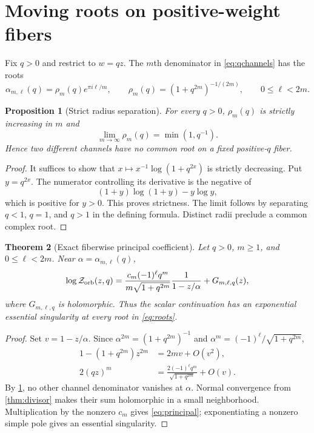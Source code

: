 \documentclass[11pt]{article}
\newtheorem{theorem}{Theorem}[section]
\newtheorem{proposition}[theorem]{Proposition}
\newcommand{\Zorb}{\mathcal Z_{\rm orb}}
\begin{document}
\section{Moving roots on positive-weight fibers}

Fix $q>0$ and restrict to $w=qz$.  The $m$th denominator in
\eqref{eq:qchannels} has the roots
\begin{equation}\label{eq:roots}
 \alpha_{m,\ell}(q)=\rho_m(q)e^{\pi i\ell/m},\qquad
 \rho_m(q)=(1+q^{2m})^{-1/(2m)},\qquad 0\le\ell<2m.
\end{equation}

\begin{proposition}[Strict radius separation]\label{prop:radii}
For every $q>0$, $\rho_m(q)$ is strictly increasing in $m$ and
\begin{equation}\label{eq:radius-limit}
 \lim_{m\to\infty}\rho_m(q)=\min(1,q^{-1}).
\end{equation}
Hence two different channels have no common root on a fixed positive-$q$
fiber.
\end{proposition}

\begin{proof}
It suffices to show that
$x\mapsto x^{-1}\log(1+q^{2x})$ is strictly decreasing.  Put
$y=q^{2x}$.  The numerator controlling its derivative is the negative of
\[
 (1+y)\log(1+y)-y\log y,
\]
which is positive for $y>0$.  This proves strictness.  The limit follows by
separating $q<1$, $q=1$, and $q>1$ in the defining formula.  Distinct radii
preclude a common complex root.
\end{proof}

\begin{theorem}[Exact fiberwise principal coefficient]\label{thm:principal}
Let $q>0$, $m\ge1$, and $0\le\ell<2m$.  Near
$\alpha=\alpha_{m,\ell}(q)$,
\begin{equation}\label{eq:principal}
 \log\Zorb(z,q)=
 \frac{c_m(-1)^\ell q^m}{m\sqrt{1+q^{2m}}}
 \frac1{1-z/\alpha}+G_{m,\ell,q}(z),
\end{equation}
where $G_{m,\ell,q}$ is holomorphic.  Thus the scalar continuation has an
exponential essential singularity at every root in \eqref{eq:roots}.
\end{theorem}

\begin{proof}
Set $v=1-z/\alpha$.  Since
$\alpha^{2m}=(1+q^{2m})^{-1}$ and
$\alpha^m=(-1)^\ell/\sqrt{1+q^{2m}}$,
\begin{align*}
 1-(1+q^{2m})z^{2m}&=2mv+O(v^2),\\
 2(qz)^m&=\frac{2(-1)^\ell q^m}{\sqrt{1+q^{2m}}}+O(v).
\end{align*}
By \cref{prop:radii}, no other channel denominator vanishes at $\alpha$.
Normal convergence from \cref{thm:divisor} makes their sum holomorphic in a
small neighborhood.  Multiplication by the nonzero $c_m$ gives
\eqref{eq:principal}; exponentiating a nonzero simple pole gives an
essential singularity.
\end{proof}
\end{document}
